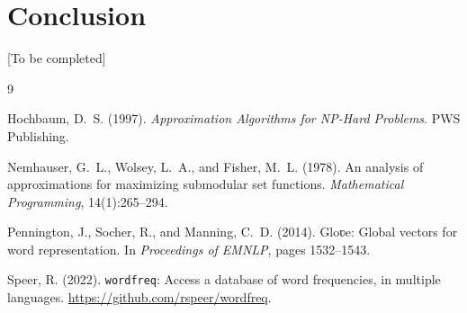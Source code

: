 \documentclass[11pt]{article}
\begin{document}
\section{Conclusion}\label{sec:conclusion}

[To be completed]


\begin{thebibliography}{9}

Hochbaum, D.~S. (1997).
\newblock \emph{Approximation Algorithms for NP-Hard Problems}.
\newblock PWS Publishing.

Nemhauser, G.~L., Wolsey, L.~A., and Fisher, M.~L. (1978).
\newblock An analysis of approximations for maximizing submodular set functions.
\newblock \emph{Mathematical Programming}, 14(1):265--294.

Pennington, J., Socher, R., and Manning, C.~D. (2014).
\newblock Gloʋe: Global vectors for word representation.
\newblock In \emph{Proceedings of EMNLP}, pages 1532--1543.

Speer, R. (2022).
\newblock \texttt{wordfreq}: Access a database of word frequencies, in multiple languages.
\newblock \url{https://github.com/rspeer/wordfreq}.

\end{thebibliography}
\end{document}
